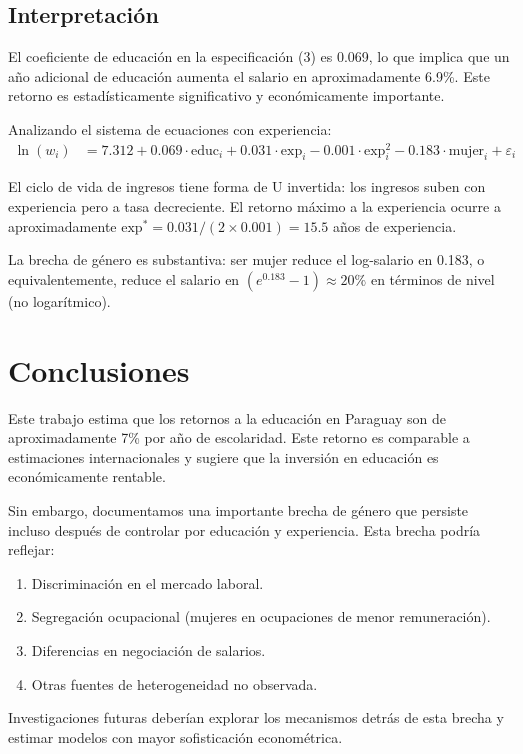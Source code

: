 \documentclass[12pt, a4paper]{article}
\theoremstyle{definition}
\theoremstyle{remark}
\begin{document}
\subsection{Interpretación}

El coeficiente de educación en la especificación (3) es 0.069, lo que implica 
que un año adicional de educación aumenta el salario en aproximadamente 
6.9\%. Este retorno es estadísticamente significativo y económicamente 
importante.

Analizando el sistema de ecuaciones con experiencia:
\begin{align}
  \ln(w_i) &= 7.312 + 0.069 \cdot \text{educ}_i + 0.031 \cdot \text{exp}_i 
             - 0.001 \cdot \text{exp}_i^2 - 0.183 \cdot \text{mujer}_i + \varepsilon_i
\end{align}

El ciclo de vida de ingresos tiene forma de U invertida: los ingresos suben 
con experiencia pero a tasa decreciente. El retorno máximo a la experiencia 
ocurre a aproximadamente $\text{exp}^* = 0.031 / (2 \times 0.001) = 15.5$ años 
de experiencia.

La brecha de género es substantiva: ser mujer reduce el log-salario en 0.183, 
o equivalentemente, reduce el salario en $(e^{0.183} - 1) \approx 20\%$ en 
términos de nivel (no logarítmico).

\section{Conclusiones}

Este trabajo estima que los retornos a la educación en Paraguay son de 
aproximadamente 7\% por año de escolaridad. Este retorno es comparable a 
estimaciones internacionales y sugiere que la inversión en educación es 
económicamente rentable.

Sin embargo, documentamos una importante brecha de género que persiste incluso 
después de controlar por educación y experiencia. Esta brecha podría reflejar:
\begin{enumerate}
  \item Discriminación en el mercado laboral.
  \item Segregación ocupacional (mujeres en ocupaciones de menor remuneración).
  \item Diferencias en negociación de salarios.
  \item Otras fuentes de heterogeneidad no observada.
\end{enumerate}

Investigaciones futuras deberían explorar los mecanismos detrás de esta brecha 
y estimar modelos con mayor sofisticación econométrica.

\newpage
\printbibliography[title={Referencias}]
\end{document}
